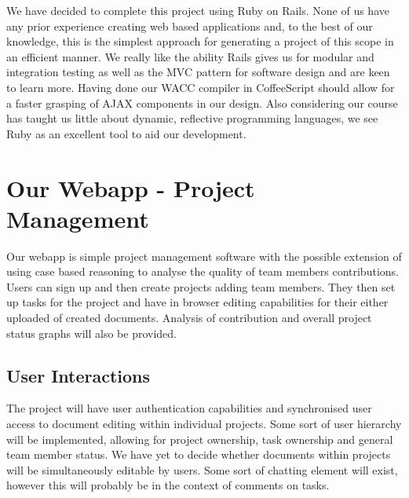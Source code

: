 \documentclass[paper=a4, fontsize=11pt]{scrartcl} %
\numberwithin{equation}{section} %
\numberwithin{figure}{section} %
\numberwithin{table}{section} %
\begin{document}
We have decided to complete this project using Ruby on Rails. None of us have any prior experience creating web based applications and, to the best of our knowledge, this is the simplest approach for generating a project of this scope in an efficient manner. We really like the ability Rails gives us for modular and integration testing as well as the MVC pattern for software design and are keen to learn more. Having done our WACC compiler in CoffeeScript should allow for a faster grasping of AJAX components in our design. Also considering our course has taught us little about dynamic, reflective programming languages, we see Ruby as an excellent tool to aid our development.



\section{Our Webapp - Project Management}

Our webapp is simple project management software with the possible extension of using case based reasoning to analyse the quality of team members contributions. Users can sign up and then create projects adding team members. They then set up tasks for the project and have in browser editing capabilities for their either uploaded of created documents. Analysis of contribution and overall project status graphs will also be provided.



\subsection{User Interactions}

The project will have user authentication capabilities and synchronised user access to document editing within individual projects. Some sort of user hierarchy will be implemented, allowing for project ownership, task ownership and general team member status. We have yet to decide whether documents within projects will be simultaneously editable by users. Some sort of chatting element will exist, however this will probably be in the context of comments on tasks.


\end{document}
